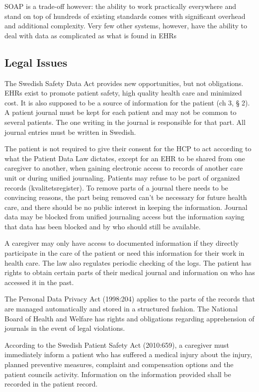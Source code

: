 \documentclass[14pt]{article}
\begin{document}
\gls{SOAP} is a trade-off however: the ability to work practically everywhere and stand on top of hundreds of existing standards comes with significant overhead and additional complexity. Very few other systems, however, have the ability to deal with data as complicated as what is found in \glspl{EHR}

\subsection{Legal Issues}
\label{sec:futureLegal}
The Swedish Safety Data Act provides new opportunities, but not obligations. \cite{RiR19}\glspl{EHR} exist to promote patient safety, high quality health care and minimized cost. It is also supposed to be a source of information for the patient (ch 3, § 2). A patient journal must be kept for each patient and may not be common to several patients. The one writing in the journal is responsible for that part. All journal entries must be written in Swedish. \cite{PatientDataAct}

The patient is not required to give their consent for the \gls{HCP} to act according to what the Patient Data Law dictates, except for an \gls{EHR} to be shared from one caregiver to another, when gaining electronic access to records of another care unit or during unified journaling. Patients may refuse to be part of organized records (kvalitetsregister). To remove parts of a journal there needs to be convincing reasons, the part being removed can't be necessary for future health care, and there should be no public interest in keeping the information. Journal data may be blocked from unified journaling access but the information saying that data has been blocked and by who should still be available. 

A caregiver may only have access to documented information if they directly participate in the care of the patient or need this information for their work in health care. The law also regulates periodic checking of the logs. The patient has rights to obtain certain parts of their medical journal and information on who has accessed it in the past.\cite{PatientDataAct}

The Personal Data Privacy Act (1998:204) applies to the parts of the records that are managed automatically and stored in a structured fashion. The National Board of Health and Welfare has rights and obligations regarding apprehension of journals in the event of legal violations.\cite{PatientDataAct}

According to the Swedish Patient Safety Act (2010:659), a caregiver must immediately inform a patient who has suffered a medical injury about the injury, planned preventive measures, complaint and compensation
options and the patient councils activity. Information on the information provided shall be recorded in the patient record.\cite{PatientSafetyAct}
\end{document}
